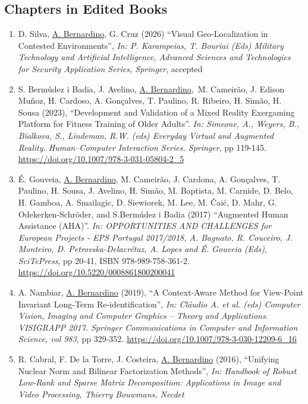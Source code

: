 \subsection{Chapters in Edited Books}\label{chapters-in-edited-books}

\begin{enumerate}
\def\labelenumi{\arabic{enumi}.}
\item
  D. Silva, \ul{A. Bernardino}, G. Cruz (2026) ``Visual Geo-Localization
  in Contested Environments'', \emph{In: P. Karampeias, T. Bouriai (Eds)
  Military Technology and Artificial Intelligence, Advanced Sciences and
  Technologies for Security Application Series, Springer}, accepted
\item
  S. Bermúdez i Badia, J. Avelino, \ul{A. Bernardino},~M. Cameirão, J.
  Edison Muñoz, H. Cardoso, A. Gonçalves, T. Paulino, R. Ribeiro, H.
  Simão, H. Sousa (2023), ``Development and Validation of a Mixed
  Reality Exergaming Platform for Fitness Training of Older Adults''.
  \emph{In: Simeone, A., Weyers, B., Bialkova, S., Lindeman, R.W. (eds)
  Everyday Virtual and Augmented Reality. Human--Computer Interaction
  Series. Springer}, pp 119-145.
  \url{https://doi.org/10.1007/978-3-031-05804-2_5}
\item
  É. Gouveia, \ul{A. Bernardino}, M. Cameirão, J. Cardona, A. Gonçalves,
  T. Paulino, H. Sousa, J. Avelino, H. Simão, M. Baptista, M. Carnide,
  D. Belo, H. Gamboa, A. Smailagic, D. Siewiorek, M. Lee, M. Čaić, D.
  Mahr, G. Odekerken-Schröder, and S.Bermúdez i Badia (2017) ``Augmented
  Human Assistance (AHA)''. \emph{In: OPPORTUNITIES AND CHALLENGES for
  European Projects - EPS Portugal 2017/2018, A. Bagnato, R. Couceiro,
  J. Monteiro, D. Petrovska-Delacrétaz, A. Lopes and É. Gouveia (Eds),
  SciTePress}, pp 20-41, ISBN 978-989-758-361-2.
  \url{https://doi.org/10.5220/0008861800200041}~
\item
  A. Nambiar, \ul{A. Bernardino} (2019), ``A Context-Aware Method for
  View-Point Invariant Long-Term Re-identification'', \emph{In: Cláudio
  A. et al. (eds) Computer Vision, Imaging and Computer Graphics --
  Theory and Applications. VISIGRAPP 2017. Springer Communications in
  Computer and Information Science, vol 983}, pp 329-352\emph{.}
  \url{https://doi.org/10.1007/978-3-030-12209-6_16}~
\item
  R. Cabral, F. De la Torre, J. Costeira, \ul{A. Bernardino} (2016),
  ``Unifying Nuclear Norm and Bilinear Factorization Methods'',
  \emph{In: Handbook of Robust Low-Rank and Sparse Matrix Decomposition:
  Applications in Image and Video Processing, Thierry Bouwmans, Necdet
}
\end{enumerate}
